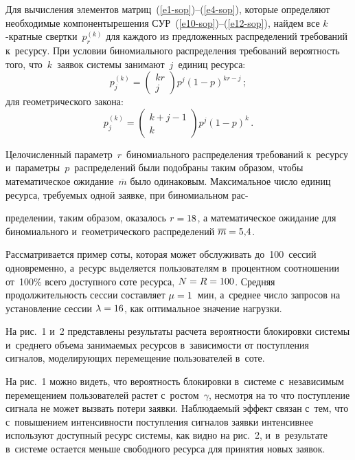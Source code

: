 \begin{multicols}{2}
  Для вычисления элементов матриц~(\ref{e1-sop})--(\ref{e4-sop}), которые 
определяют необходимые компоненты\linebreak реше\-ния 
СУР~(\ref{e10-sop})--(\ref{e12-sop}), найдем все $k$-крат\-ные 
свертки~$p_r^{(k)}$ для каждого из предложенных распределений 
требований к~ресурсу. При условии биномиального распределения 
требований вероятность того, что~$k$~заявок системы 
занимают~$j$~единиц ресурса:
$$
p_j^{(k)}= \begin{pmatrix} kr\\ 
j\end{pmatrix} p^j(1-p)^{kr-j}\,; 
$$
для геометрического закона:
$$
p_j^{(k)}  = \begin{pmatrix} k+j-1\\ k\end{pmatrix} p^j(1-p)^k\,.
$$

 Целочисленный 
параметр~$r$~биномиального распреде\-ления требований к~ресурсу 
и~па\-ра\-мет\-ры~$p$~распределений были подобраны таким образом, чтобы 
математическое ожидание~$\overline{m}$ было одинаковым. Максимальное 
число единиц ресурса, требуемых одной заявке, при биномиальном 
рас-\linebreak\vspace*{-12pt}

\columnbreak

\noindent
пределении, таким образом, оказалось $r\hm=18$, а математическое 
ожидание для биномиального и~геометрического распределений 
$\overline{m}\hm=5{,}4$.
  
  Рассматривается пример соты, которая может обслуживать до~100~сессий 
одновременно, а~ресурс выделяется пользователям в~процентном 
соотношении от~100\% всего доступного соте ресурса, $N\hm=R\hm=100$. 
Средняя продолжительность сессии составляет $\mu\hm=1$~мин, а~среднее 
число запросов на установление сессии $\lambda\hm=16$, как оптимальное 
значение нагрузки. 
  
  На рис.~1 и~2 представлены результаты расчета вероятности блокировки 
системы и~среднего объема занимаемых ресурсов в~зависимости от 
поступления сигналов, моделирующих перемещение пользователей в~соте. 
  


  На рис.~1 можно видеть, что вероятность блокировки в~системе 
с~независимым перемещением пользователей растет с~ростом~$\gamma$, 
несмотря на то что поступление сигнала не может вызвать потери заявки. 
Наблюдаемый эффект связан с~тем, что с~повышением интенсивности 
поступления сигналов заявки интенсивнее используют доступный ресурс 
системы, как видно на рис.~2, и~в~результате в~системе остается меньше 
свободного ресурса для принятия новых заявок.


\end{multicols}
